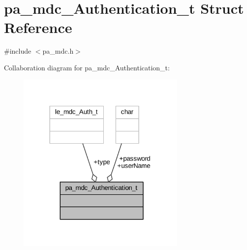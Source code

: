 \hypertarget{structpa__mdc___authentication__t}{}\section{pa\+\_\+mdc\+\_\+\+Authentication\+\_\+t Struct Reference}
\label{structpa__mdc___authentication__t}


{\ttfamily \#include $<$pa\+\_\+mdc.\+h$>$}



Collaboration diagram for pa\+\_\+mdc\+\_\+\+Authentication\+\_\+t\+:
\nopagebreak
\begin{figure}[H]
\begin{center}
\leavevmode
\includegraphics[width=234pt]{structpa__mdc___authentication__t__coll__graph}
\end{center}
\end{figure}
